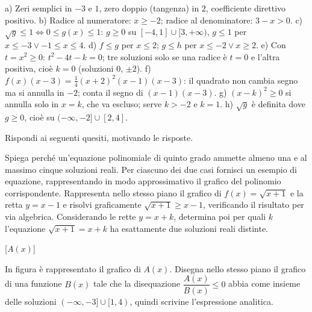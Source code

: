 \documentclass[10pt]{article}
\begin{document}
\begin{solution}
a) Zeri semplici in $-3$ e $1$, zero doppio (tangenza) in $2$, coefficiente direttivo positivo.
b) Radice al numeratore: $x \geq -2$; radice al denominatore: $3 - x > 0$.
c) $\sqrt{g} \leq 1 \iff 0 \leq g(x) \leq 1$: $g \geq 0$ su $[-4, 1] \cup [3, +\infty)$, $g \leq 1$ per
$x \leq -3 \lor -1 \leq x \leq 4$.
d) $f \leq g$ per $x \leq 2$; $g \leq h$ per $x \leq -2 \lor x \geq 2$.
e) Con $t = x^2 \geq 0$: $t^2 - 4t - k = 0$; tre soluzioni solo se una radice è $t = 0$ e l'altra positiva, cioè $k = 0$ (soluzioni $0$, $\pm 2$).
f) $f(x)(x-3) = \frac14 (x+2)^2(x-1)(x-3)$: il quadrato non cambia segno ma si annulla in $-2$; conta il segno di $(x-1)(x-3)$.
g) $(x-k)^2 \geq 0$ si annulla solo in $x = k$, che va escluso; serve $k > -2$ e $k = 1$.
h) $\sqrt{g}$ è definita dove $g \geq 0$, cioè su $(-\infty, -2] \cup [2, 4]$.
\end{solution}

\exercise Rispondi ai seguenti quesiti, motivando le risposte.

\begin{parts}[stretch=1.1]
  \itemx[pts=1.5, diff=2] Spiega perché un'equazione polinomiale di quinto grado ammette almeno una e al massimo cinque soluzioni reali. Per ciascuno dei due casi fornisci un esempio di equazione, rappresentando in modo approssimativo il grafico del polinomio corrispondente.
  \itemx[pts=2, diff=3] Rappresenta nello stesso piano il grafico di $f(x) = \sqrt{x + 1}$ e la retta $y = x - 1$ e risolvi graficamente $\sqrt{x + 1} \geq x - 1$, verificando il risultato per via algebrica. Considerando le rette $y = x + k$, determina poi per quali $k$ l'equazione $\sqrt{x + 1} = x + k$ ha esattamente due soluzioni reali distinte.
\end{parts}

\vspace{.4em}
\noindent
\begin{minipage}[c]{.35\linewidth}
  \centering
  \begin{ftplot}[quiz, xmin=-4.9, xmax=4.9, ymin=-4.9, ymax=4.9, legend pos=north east,
                 xtick distance=2, ytick distance=2, minor tick num=1]
    [$A(x)$]
  \end{ftplot}
\end{minipage}\hfill
\begin{minipage}[c]{.64\linewidth}
  \begin{parts}[ragged]
    \itemx[pts=1.5, diff=3] In figura è rappresentato il grafico di $A(x)$. Disegna nello stesso piano il grafico di una funzione $B(x)$ tale che la disequazione $\dfrac{A(x)}{B(x)} \leq 0$ abbia come insieme delle soluzioni $(-\infty, -3] \cup [1, 4)$, quindi scrivine l'espressione analitica.
  \end{parts}
\end{minipage}
\end{document}
